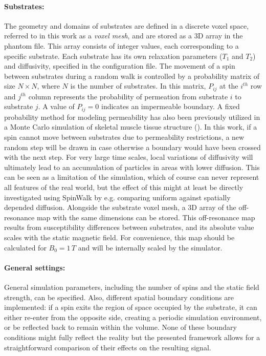\paragraph{\textbf{Substrates:}} The geometry and domains of substrates are defined in a discrete voxel space, referred to in this work as a \textit{voxel mesh}, and are stored as a 3D array in the phantom file. This array consists of integer values, each corresponding to a specific substrate. Each substrate has its own relaxation parameters (\(T_1\) and \(T_2\)) and diffusivity, specified in the configuration file. The movement of a spin between substrates during a random walk is controlled by a probability matrix of size \(N \times N\), where \(N\) is the number of substrates. In this matrix, \(P_{ij}\) at the \(i^{th}\) row and \(j^{th}\) column represents the probability of permeation from substrate \(i\) to substrate \(j\). A value of \(P_{ij} = 0\) indicates an impermeable boundary. A fixed probability method for modeling permeability has also been previously utilized in a Monte Carlo simulation of skeletal muscle tissue structure (\cite{hall2017diffusion}). In this work, if a spin cannot move between substrates due to permeability restrictions, a new random step will be drawn in case otherwise a boundary would have been crossed with the next step. For very large time scales, local variations of diffusivity will ultimately lead to an accumulation of particles in areas with lower diffusion. This can be seen as a limitation of the simulation, which of course can never represent all features of the real world, but the effect of this might at least be directly investigated using SpinWalk by e.g. comparing uniform against spatially depended diffusion. Alongside the substrate voxel mesh, a 3D array of the off-resonance map with the same dimensions can be stored. This off-resonance map results from susceptibility differences between substrates, and its absolute value scales with the static magnetic field. For convenience, this map should be calculated for \(B_0 = 1\,T\) and will be internally scaled by the simulator.

\paragraph{\textbf{General settings:}} General simulation parameters, including the number of spins and the static field strength, can be specified. Also, different spatial boundary conditions are implemented: if a spin exits the region of space occupied by the substrate, it can either re-enter from the opposite side, creating a periodic simulation environment, or be reflected back to remain within the volume. None of these boundary conditions might fully reflect the reality but the presented framework allows for a straightforward comparison of their effects on the resulting signal.